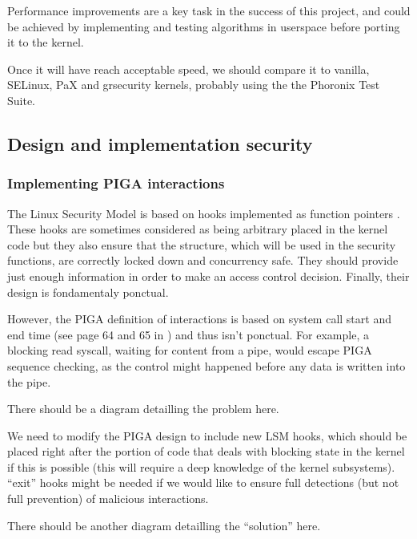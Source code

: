 \documentclass[pdftex,a4paper,titlepage,11pt]{article}
\begin{document}
Performance improvements are a key task in the success of this project, and
could be achieved by implementing and testing algorithms in userspace before
porting it to the kernel.

Once it will have reach acceptable speed, we should compare it to vanilla,
SELinux, PaX and grsecurity kernels, probably using the the Phoronix Test Suite.

\subsection{Design and implementation security}

\subsubsection{Implementing PIGA interactions}

The Linux Security Model is based on hooks implemented as function pointers
\cite{lsm2002linux}.
These hooks are sometimes considered as being arbitrary placed in the kernel
code \cite{grsecuritylsm} but they also ensure that the structure, which
will be used
in the security functions, are correctly locked down and concurrency safe. They
should provide just enough information in order to make an access control
decision. Finally, their design is fondamentaly ponctual.

\bigskip

However, the PIGA definition of interactions is based on system call start and
end time (see page 64 and 65 in \cite{theseJBriffaut}) and thus isn't ponctual.
For example, a blocking read syscall, waiting for content from a pipe, would
escape PIGA sequence checking, as the control might happened before any data is
written into the pipe.

\bigskip

There should be a diagram detailling the problem here.

\bigskip

We need to modify the PIGA design to include new LSM hooks, which should be
placed right after the portion of code that deals with blocking state in the
kernel if this is possible (this will require a deep knowledge of the kernel
subsystems). ``exit'' hooks might be needed if we would like to ensure full
detections (but not full prevention) of malicious interactions.

\bigskip

There should be another diagram detailling the ``solution'' here.
\end{document}
